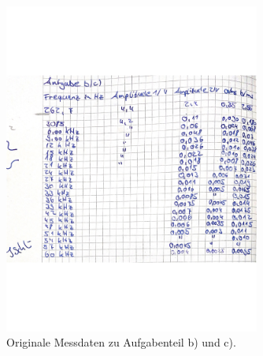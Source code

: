 \begin{figure}[H]
    \centering
    \includegraphics[width=0.75\textwidth]{Dateien/daten2.jpg}
    \caption{Originale Messdaten zu Aufgabenteil b) und c).}
    \label{fig:daten2}
\end{figure}